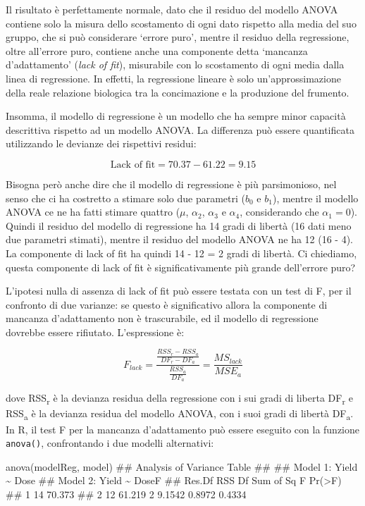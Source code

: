\documentclass[a4paper,12pt,oneside]{book}
\newenvironment{Shaded}{\begin{snugshade}}{\end{snugshade}}
\newcommand{\DocumentationTok}[1]{#1}
\newcommand{\FunctionTok}[1]{#1}
\newcommand{\NormalTok}[1]{#1}
\begin{document}
Il risultato è perfettamente normale, dato che il residuo del modello ANOVA contiene solo la misura dello scostamento di ogni dato rispetto alla media del suo gruppo, che si può considerare `errore puro', mentre il residuo della regressione, oltre all'errore puro, contiene anche una componente detta `mancanza d'adattamento' (\emph{lack of fit}), misurabile con lo scostamento di ogni media dalla linea di regressione. In effetti, la regressione lineare è solo un'approssimazione della reale relazione biologica tra la concimazione e la produzione del frumento.

Insomma, il modello di regressione è un modello che ha sempre minor capacità descrittiva rispetto ad un modello ANOVA. La differenza può essere quantificata utilizzando le devianze dei rispettivi residui:

\[\textrm{Lack of fit} = 70.37 - 61.22 = 9.15\]

Bisogna però anche dire che il modello di regressione è più parsimonioso, nel senso che ci ha costretto a stimare solo due parametri (\(b_0\) e \(b_1\)), mentre il modello ANOVA ce ne ha fatti stimare quattro (\(\mu\), \(\alpha_2\), \(\alpha_3\) e \(\alpha_4\), considerando che \(\alpha_1 = 0\)). Quindi il residuo del modello di regressione ha 14 gradi di libertà (16 dati meno due parametri stimati), mentre il residuo del modello ANOVA ne ha 12 (16 - 4). La componente di lack of fit ha quindi 14 - 12 = 2 gradi di libertà. Ci chiediamo, questa componente di lack of fit è significativamente più grande dell'errore puro?

L'ipotesi nulla di assenza di lack of fit può essere testata con un test di F, per il confronto di due varianze: se questo è significativo allora la componente di mancanza d'adattamento non è trascurabile, ed il modello di regressione dovrebbe essere rifiutato. L'espressione è:

\[ F_{lack} = \frac{\frac{RSS_r - RSS_a}{DF_r-DF_a} } {\frac{RSS_a}{DF_a}} = \frac{MS_{lack}}{MSE_a}\]

dove RSS\textsubscript{r} è la devianza residua della regressione con i sui gradi di liberta DF\textsubscript{r} e RSS\textsubscript{a} è la devianza residua del modello ANOVA, con i suoi gradi di libertà DF\textsubscript{a}. In R, il test F per la mancanza d'adattamento può essere eseguito con la funzione \texttt{anova()}, confrontando i due modelli alternativi:

\begin{Shaded}
\begin{Highlighting}[]
\FunctionTok{anova}\NormalTok{(modelReg, model)}
\DocumentationTok{\#\# Analysis of Variance Table}
\DocumentationTok{\#\# }
\DocumentationTok{\#\# Model 1: Yield \textasciitilde{} Dose}
\DocumentationTok{\#\# Model 2: Yield \textasciitilde{} DoseF}
\DocumentationTok{\#\#   Res.Df    RSS Df Sum of Sq      F Pr(\textgreater{}F)}
\DocumentationTok{\#\# 1     14 70.373                           }
\DocumentationTok{\#\# 2     12 61.219  2    9.1542 0.8972 0.4334}
\end{Highlighting}
\end{Shaded}
\end{document}
